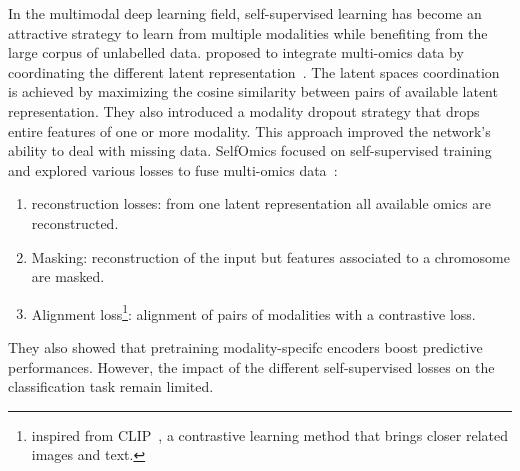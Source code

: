 \documentclass[../main.tex]{subfiles}
\begin{document}
		In the multimodal deep learning field, self-supervised learning has become an attractive strategy to learn from multiple modalities while benefiting from the large corpus of unlabelled data.
		\citeauthor{Cheerla2019} proposed to integrate multi-omics data by coordinating the different latent representation~\cite{Cheerla2019}.
		The latent spaces coordination is achieved by maximizing the cosine similarity between pairs of available latent representation.
		They also introduced a modality dropout strategy that drops entire features of one or more modality.
		This approach improved the network’s ability to deal with missing data.
		SelfOmics focused on self-supervised training and explored various losses to fuse multi-omics data~\cite{selfOmics}:
		\begin{enumerate}[nosep]
			\item reconstruction losses: from one latent representation all available omics are reconstructed.
			\item Masking: reconstruction of the input but features associated to a chromosome are masked.
			\item Alignment loss\footnote{inspired from CLIP~\cite{CLIPLoss}, a contrastive learning method that brings closer related images and text.}: alignment of pairs of modalities with a contrastive loss.
		\end{enumerate}
		They also showed that pretraining modality-specifc encoders boost predictive performances.
		However, the impact of the different self-supervised losses on the classification task remain limited.
\end{document}
